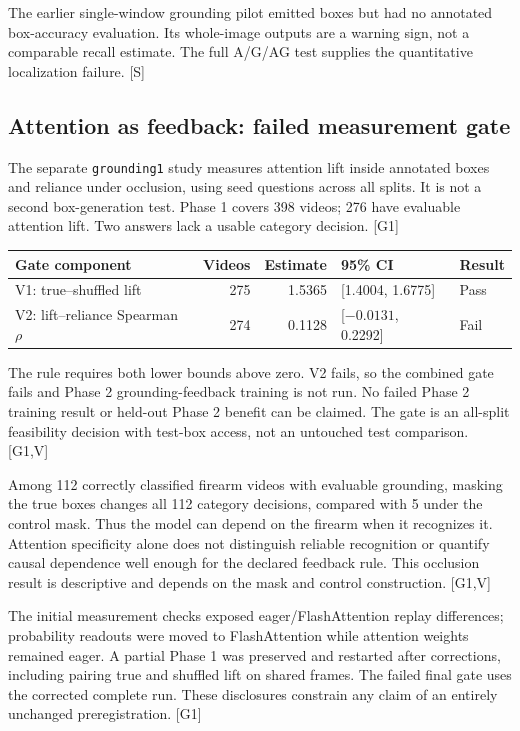 \documentclass[11pt]{article}
\newcommand{\src}[1]{\textsf{[#1]}}
\begin{document}
The earlier single-window grounding pilot emitted boxes but had no annotated box-accuracy evaluation. Its whole-image outputs are a warning sign, not a comparable recall estimate. The full A/G/AG test supplies the quantitative localization failure. \src{S}

\subsection{Attention as feedback: failed measurement gate}
The separate \texttt{grounding1} study measures attention lift inside annotated boxes and reliance under occlusion, using seed questions across all splits. It is not a second box-generation test. Phase 1 covers 398 videos; 276 have evaluable attention lift. Two answers lack a usable category decision. \src{G1}

\begin{center}\small\begin{tabular}{@{}lrrll@{}}\toprule
Gate component & Videos & Estimate & 95\% CI & Result\\\midrule
V1: true--shuffled lift & 275 & 1.5365 & [1.4004, 1.6775] & Pass\\
V2: lift--reliance Spearman $\rho$ & 274 & 0.1128 & [$-0.0131$, 0.2292] & Fail\\\bottomrule
\end{tabular}\end{center}

The rule requires both lower bounds above zero. V2 fails, so the combined gate fails and Phase 2 grounding-feedback training is not run. No failed Phase 2 training result or held-out Phase 2 benefit can be claimed. The gate is an all-split feasibility decision with test-box access, not an untouched test comparison. \src{G1,V}

Among 112 correctly classified firearm videos with evaluable grounding, masking the true boxes changes all 112 category decisions, compared with 5 under the control mask. Thus the model can depend on the firearm when it recognizes it. Attention specificity alone does not distinguish reliable recognition or quantify causal dependence well enough for the declared feedback rule. This occlusion result is descriptive and depends on the mask and control construction. \src{G1,V}

The initial measurement checks exposed eager/FlashAttention replay differences; probability readouts were moved to FlashAttention while attention weights remained eager. A partial Phase 1 was preserved and restarted after corrections, including pairing true and shuffled lift on shared frames. The failed final gate uses the corrected complete run. These disclosures constrain any claim of an entirely unchanged preregistration. \src{G1}
\end{document}
